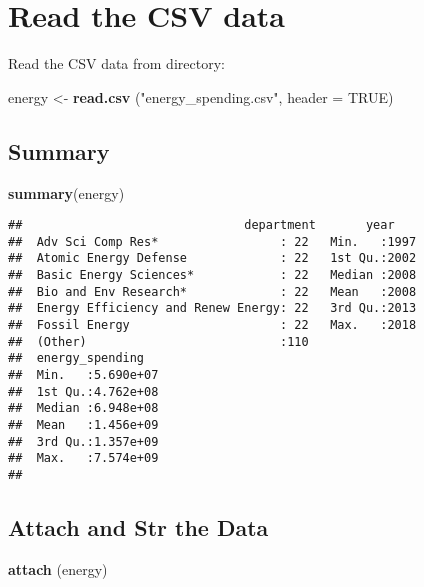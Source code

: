 \documentclass[]{article}
\newenvironment{Shaded}{\begin{snugshade}}{\end{snugshade}}
\newcommand{\KeywordTok}[1]{\textcolor[rgb]{0.13,0.29,0.53}{\textbf{#1}}}
\newcommand{\DataTypeTok}[1]{\textcolor[rgb]{0.13,0.29,0.53}{#1}}
\newcommand{\StringTok}[1]{\textcolor[rgb]{0.31,0.60,0.02}{#1}}
\newcommand{\OtherTok}[1]{\textcolor[rgb]{0.56,0.35,0.01}{#1}}
\newcommand{\NormalTok}[1]{#1}
\begin{document}
\section{Read the CSV data}\label{read-the-csv-data}

Read the CSV data from directory:

\begin{Shaded}
\begin{Highlighting}[]
\NormalTok{energy <-}\StringTok{ }\KeywordTok{read.csv}\NormalTok{ (}\StringTok{"energy_spending.csv"}\NormalTok{, }\DataTypeTok{header =} \OtherTok{TRUE}\NormalTok{)}
\end{Highlighting}
\end{Shaded}

\subsection{Summary}\label{summary-1}

\begin{Shaded}
\begin{Highlighting}[]
\KeywordTok{summary}\NormalTok{(energy)}
\end{Highlighting}
\end{Shaded}

\begin{verbatim}
##                               department       year     
##  Adv Sci Comp Res*                 : 22   Min.   :1997  
##  Atomic Energy Defense             : 22   1st Qu.:2002  
##  Basic Energy Sciences*            : 22   Median :2008  
##  Bio and Env Research*             : 22   Mean   :2008  
##  Energy Efficiency and Renew Energy: 22   3rd Qu.:2013  
##  Fossil Energy                     : 22   Max.   :2018  
##  (Other)                           :110                 
##  energy_spending    
##  Min.   :5.690e+07  
##  1st Qu.:4.762e+08  
##  Median :6.948e+08  
##  Mean   :1.456e+09  
##  3rd Qu.:1.357e+09  
##  Max.   :7.574e+09  
## 
\end{verbatim}

\subsection{Attach and Str the Data}\label{attach-and-str-the-data}

\begin{Shaded}
\begin{Highlighting}[]
\KeywordTok{attach}\NormalTok{ (energy)}
\end{Highlighting}
\end{Shaded}
\end{document}
